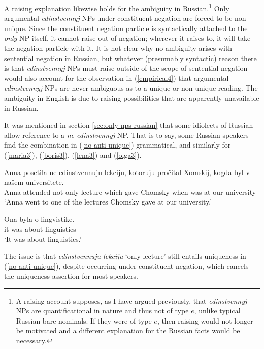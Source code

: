 A raising explanation likewise holds for the ambiguity in Russian.\footnote{A raising account supposes, as I have argued previously, that \textit{edinstvennyj} NPs are quantificational in nature and thus not of type $e$, unlike typical Russian bare nominals. If they were of type $e$, then raising would not longer be motivated and a different explanation for the Russian facts would be necessary.} Only argumental \textit{edinstvennyj} NPs under constituent negation are forced to be non-unique. Since the constituent negation particle is syntactically attached to the \textit{only} NP itself, it cannot raise out of negation; wherever it raises to, it will take the negation particle with it. It is not clear why no ambiguity arises with sentential negation in Russian, but whatever (presumably syntactic) reason there is that \textit{edinstvennyj} NPs must raise outside of the scope of sentential negation would also account for the observation in (\ref{empirical4}) that argumental \textit{edinstvennyj} NPs are never ambiguous as to a unique or non-unique reading. The ambiguity in English is due to raising possibilities that are apparently unavailable in Russian.

It was mentioned in section \ref{sec:only-nps-russian} that some idiolects of Russian allow reference to a \textit{ne edinstvennyj} NP. That is to say, some Russian speakers find the combination in (\ref{no-anti-unique}) grammatical, and similarly for (\ref{maria3}), (\ref{boris3}), (\ref{lena3}) and (\ref{olga3}).

\begin{exe}
	\ex \label{no-anti-unique} \begin{xlist}
		\ex \gll Anna posetila ne edinstvennuju lekciju, kotoruju pro\v{c}ital Xomskij, kogda byl v na\v{s}em universitete.\\
		Anna attended not only lecture which gave Chomsky when was at our university\\
		\glt `Anna went to one of the lectures Chomsky gave at our university.'
		
		\ex \gll Ona byla o lingvistike.\\
		it was about linguistics\\
		\glt `It was about linguistics.'
	\end{xlist}
\end{exe}

The issue is that \textit{edinstvennuju lekciju} `only lecture' still entails uniqueness in (\ref{no-anti-unique}), despite occurring under constituent negation, which cancels the uniqueness assertion for most speakers.

